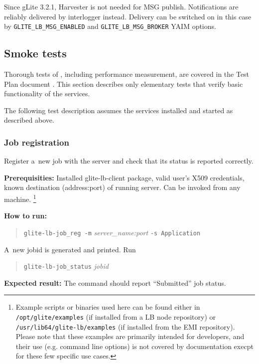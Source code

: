 Since gLite 3.2.1, \LB Harvester is not needed for MSG publish. Notifications are reliably delivered by interlogger instead. Delivery can be switched on in this case by \texttt{GLITE\_LB\_MSG\_ENABLED} and \texttt{GLITE\_LB\_MSG\_BROKER} YAIM options.

\subsection{Smoke tests}

Thorough tests of \LB, including performance measurement, are
covered in the \LB Test Plan document \cite{lbtp}.
This section describes only elementary tests that verify basic
functionality of the services.

The following test description assumes the \LB services installed
and started as described above.

\def\req{\noindent\textbf{Prerequisities:}\xspace}
\def\how{\noindent\textbf{How to run:}\xspace}
\def\result{\noindent\textbf{Expected result:}\xspace}

\subsubsection{Job registration}

Register a~new job with the \LB server and check that its status is
reported correctly.

\req Installed glite-lb-client package, valid user's X509 credentials,
known destination (address:port) of running \LB server.
Can be invoked from any machine.
\footnote{Example scripts or binaries used here can be found either
in \texttt{/opt/glite/examples} (if installed from a LB node repository) or
\texttt{/usr/lib64/glite-lb/examples} (if installed from the EMI repository). Please note that these examples are primarily intended for developers, and their use (e.g. command line options) is not covered by documentation execpt for these few specific use cases.}\setcounter{examplesfootnote}{\thefootnote}

\how 
\begin{quote}
\texttt{glite-lb-job\_reg -m} \emph{server\_name:port} \texttt{-s Application}
\end{quote}
A~new jobid is generated and printed.  Run 
\begin{quote}
\verb'glite-lb-job_status' \emph{jobid}
\end{quote}

\result
The command should report ``Submitted'' job status.

